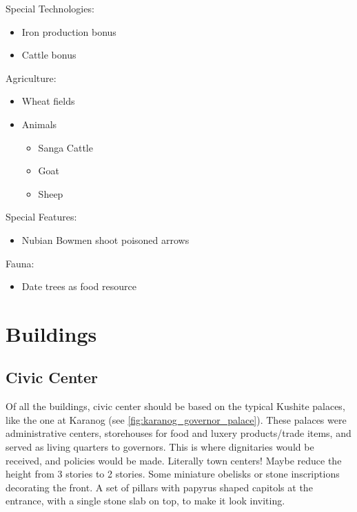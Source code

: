 \documentclass[a4paper,12pt]{scrreprt}
\begin{document}
Special Technologies:

\begin{itemize}
	\item Iron production bonus
	\item Cattle bonus
\end{itemize}

Agriculture:

\begin{itemize}
	\item Wheat fields
	\item Animals
	\begin{itemize}
		\item Sanga Cattle
		\item Goat
		\item Sheep
	\end{itemize}
\end{itemize}
Special Features:

\begin{itemize}
	\item Nubian Bowmen shoot poisoned arrows
\end{itemize}

Fauna:

\begin{itemize}
	\item Date trees as food resource
\end{itemize}

\section{Buildings}

\subsection{Civic Center}

Of all the buildings, civic center should be based on the typical Kushite palaces, like the one at Karanog (see \ref{fig:karanog_governor_palace}). These palaces were administrative centers, storehouses for food and luxery products/trade items, and served as living quarters to governors. This is where dignitaries would be received, and policies would be made. Literally town centers! Maybe reduce the height from 3 stories to 2 stories. Some miniature obelisks or stone inscriptions decorating the front. A set of pillars with papyrus shaped capitols at the entrance, with a single stone slab on top, to make it look inviting. 
\end{document}
